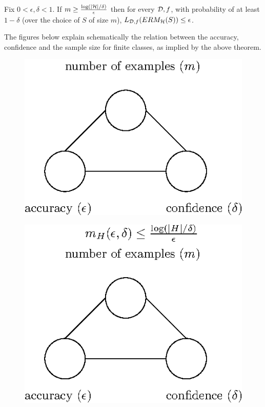 {\begin{theorem}
	Fix $0< \epsilon,\delta <1$. If $m \ge \frac{\log(|\mathcal{H}|/\delta)}{\epsilon}$ then for every $\mathcal{D},f$, with probability of at least $1-\delta$ (over the choice of $S$ of size $m$), $L_{\mathcal{D},f}(ERM_{\mathcal{H}}(S)) \le \epsilon$.
\end{theorem}

The figures below explain schematically the relation between the accuracy, confidence and the sample size for finite classes, as implied by the above theorem.

\begin{figure}[h!]
	\centering\includegraphics[scale=0.8]{chapters/pac/figures/connection_m_eps_delta.eps}
\end{figure}


\begin{figure}[h!]
	\centering\includegraphics[scale=0.8]{chapters/pac/figures/connection_m_eps_delta_finite4.eps}
\end{figure}


}
